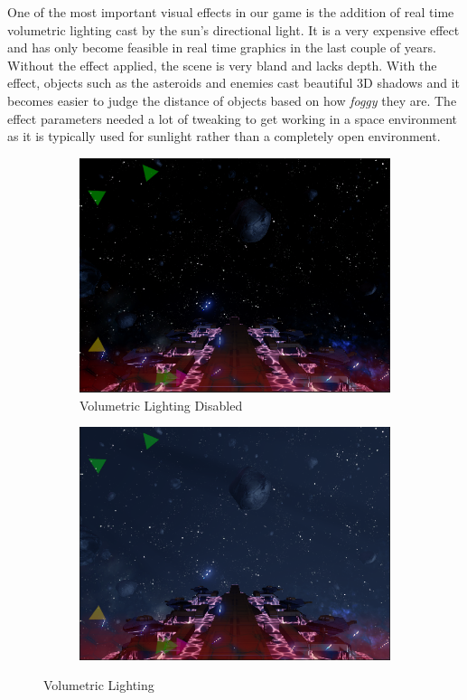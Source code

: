 \documentclass[a4paper,11pt]{article}
\begin{document}
One of the most important visual effects in our game is the addition of real time volumetric lighting cast by the sun’s directional light\cite{volumetric_lighting}. It is a very expensive effect and has only become feasible in real time graphics in the last couple of years. Without the effect applied, the scene is very bland and lacks depth. With the effect, objects such as the asteroids and enemies cast beautiful 3D shadows and it becomes easier to judge the distance of objects based on how \emph{foggy} they are. The effect parameters needed a lot of tweaking to get working in a space environment as it is typically used for sunlight rather than a completely open environment.

\begin{figure}[ht]
	\centering
    
    \begin{subfigure}{.5\textwidth}
      \centering
      \includegraphics[width=.97\textwidth]{volumetricOff}
      \caption{Volumetric Lighting Disabled}
      \label{fig:volumetricOff}
    \end{subfigure}%
    \begin{subfigure}{.5\textwidth}
    	\centering
		\includegraphics[width=.97\textwidth]{volumetricOn}
        \label{fig:volumetricOn}
	\end{subfigure}
	\caption{Volumetric Lighting}
	\label{fig:volumetric}
\end{figure}
\end{document}
